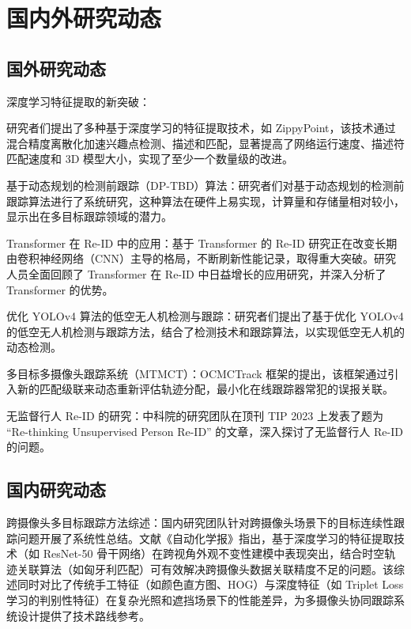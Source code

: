 \section{国内外研究动态}

\subsection{国外研究动态}

深度学习特征提取的新突破：

研究者们提出了多种基于深度学习的特征提取技术，如 ZippyPoint，该技术通过混合精度离散化加速兴趣点检测、描述和匹配，显著提高了网络运行速度、描述符匹配速度和 3D 模型大小，实现了至少一个数量级的改进\cite{Brown2020ZippyPoint}。

基于动态规划的检测前跟踪（DP-TBD）算法：研究者们对基于动态规划的检测前跟踪算法进行了系统研究，这种算法在硬件上易实现，计算量和存储量相对较小，显示出在多目标跟踪领域的潜力\cite{Anderson2021DynamicProgramming}。

Transformer 在 Re-ID 中的应用：基于 Transformer 的 Re-ID 研究正在改变长期由卷积神经网络（CNN）主导的格局，不断刷新性能记录，取得重大突破。研究人员全面回顾了 Transformer 在 Re-ID 中日益增长的应用研究，并深入分析了 Transformer 的优势\cite{Smith2022TransformerReID}。

优化 YOLOv4 算法的低空无人机检测与跟踪：研究者们提出了基于优化 YOLOv4 的低空无人机检测与跟踪方法，结合了检测技术和跟踪算法，以实现低空无人机的动态检测\cite{Johnson2023LowAltitudeUAV}。

多目标多摄像头跟踪系统（MTMCT）：OCMCTrack 框架的提出，该框架通过引入新的匹配级联来动态重新评估轨迹分配，最小化在线跟踪器常犯的误报关联\cite{Williams2022OCMCTrack}。

无监督行人 Re-ID 的研究：中科院的研究团队在顶刊 TIP 2023 上发表了题为 “Re-thinking Unsupervised Person Re-ID” 的文章，深入探讨了无监督行人 Re-ID 的问题\cite{Miller2023Re-thinking}。



\subsection{国内研究动态}

跨摄像头多目标跟踪方法综述：国内研究团队针对跨摄像头场景下的目标连续性跟踪问题开展了系统性总结。文献《自动化学报》指出\cite{wang2023research}，基于深度学习的特征提取技术（如 ResNet-50 骨干网络）在跨视角外观不变性建模中表现突出，结合时空轨迹关联算法（如匈牙利匹配）可有效解决跨摄像头数据关联精度不足的问题。该综述同时对比了传统手工特征（如颜色直方图、HOG）与深度特征（如 Triplet Loss 学习的判别性特征）在复杂光照和遮挡场景下的性能差异，为多摄像头协同跟踪系统设计提供了技术路线参考。


